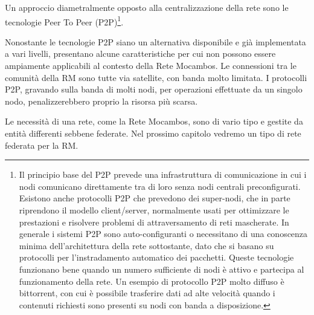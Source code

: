 Un approccio diametralmente opposto alla centralizzazione della rete
sono le tecnologie Peer To Peer (P2P)\footnote{Il principio base del
  P2P prevede una infrastruttura di comunicazione in cui i nodi
  comunicano direttamente tra di loro senza nodi centrali
  preconfigurati. Esistono anche protocolli P2P che prevedono dei
  super-nodi, che in parte riprendono il modello client/server,
  normalmente usati per ottimizzare le prestazioni e risolvere
  problemi di attraversamento di reti mascherate. In generale i
  sistemi P2P sono auto-configuranti o necessitano di una conoscenza
  minima dell'architettura della rete sottostante, dato che si basano
  su protocolli per l'instradamento automatico dei pacchetti. Queste
  tecnologie funzionano bene quando un numero sufficiente di nodi è
  attivo e partecipa al funzionamento della rete. Un esempio di
  protocollo P2P molto diffuso è bittorrent, con cui è possibile
  trasferire dati ad alte velocità quando i contenuti richiesti sono
  presenti su nodi con banda a disposizione.}.

Nonostante le tecnologie P2P siano un alternativa disponibile e già
implementata a vari livelli, presentano alcune caratteristiche per cui
non possono essere ampiamente applicabili al contesto della Rete
Mocambos. Le connessioni tra le comunità della RM sono tutte via
satellite, con banda molto limitata. I protocolli P2P, gravando sulla
banda di molti nodi, per operazioni effettuate da un singolo nodo,
penalizzerebbero proprio la risorsa più scarsa. 

Le necessità di una rete, come la Rete Mocambos, sono di vario tipo e
gestite da entità differenti sebbene federate. Nel prossimo capitolo
vedremo un tipo di rete federata per la RM.


